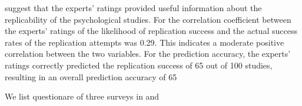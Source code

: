 \documentclass[12pt, a4paper, twocolumn]{article}
\begin{document}
	\citet{Gordon2021} suggest that the experts' ratings provided useful information about the replicability of the psychological studies. For the correlation coefficient between the experts' ratings of the likelihood of replication success and the actual success rates of the replication attempts was 0.29. This indicates a moderate positive correlation between the two variables. For the prediction accuracy, the experts' ratings correctly predicted the replication success of 65 out of 100 studies, resulting in an overall prediction accuracy of 65%
	
	We list questionare of three surveys in  and  
\end{document}
